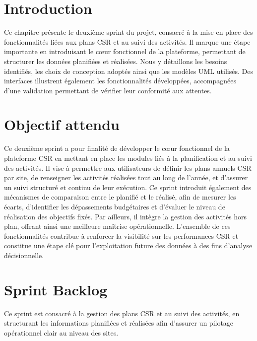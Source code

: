 
\section{Introduction}
Ce chapitre présente le deuxième sprint du projet, consacré à la mise en place des fonctionnalités liées aux plans CSR et au suivi des activités. Il marque une étape importante en introduisant le cœur fonctionnel de la plateforme, permettant de structurer les données planifiées et réalisées.
Nous y détaillons les besoins identifiés, les choix de conception adoptés ainsi que les modèles UML utilisés. Des interfaces illustrent également les fonctionnalités développées, accompagnées d’une validation permettant de vérifier leur conformité aux attentes.



\section{Objectif attendu}

Ce deuxième sprint a pour finalité de développer le cœur fonctionnel de la plateforme CSR en mettant en place les modules liés à la planification et au suivi des activités. Il vise à permettre aux utilisateurs de définir les plans annuels CSR par site, de renseigner les activités réalisées tout au long de l’année, et d’assurer un suivi structuré et continu de leur exécution. Ce sprint introduit également des mécanismes de comparaison entre le planifié et le réalisé, afin de mesurer les écarts, d’identifier les dépassements budgétaires et d’évaluer le niveau de réalisation des objectifs fixés. Par ailleurs, il intègre la gestion des activités hors plan, offrant ainsi une meilleure maîtrise opérationnelle. L’ensemble de ces fonctionnalités contribue à renforcer la visibilité sur les performances CSR et constitue une étape clé pour l’exploitation future des données à des fins d’analyse décisionnelle.

\section{Sprint Backlog}

Ce sprint est consacré à la gestion des plans CSR et au suivi des activités, en structurant les informations planifiées et réalisées afin d'assurer un pilotage opérationnel clair au niveau des sites.

